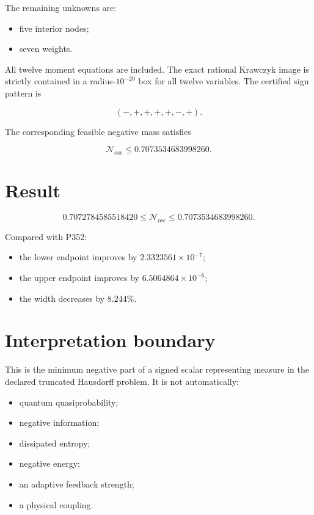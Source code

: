 \documentclass[11pt,a4paper,openany]{report}
\begin{document}
The remaining unknowns are:

\begin{itemize}
\item 
five interior nodes;

\item 
seven weights.

\end{itemize}

All twelve moment equations are included. The exact rational Krawczyk image is strictly contained in a radius-\(10^{-20}\) box for all twelve variables. The certified sign pattern is

\[
(-,+,+,+,+,-,+).
\]

The corresponding feasible negative mass satisfies

\[
\mathcal N_{\mathrm{osc}}
\leq0.7073534683998260.
\]

\section{Result}

\[
\boxed{
0.7072784585518420
\leq
\mathcal N_{\mathrm{osc}}
\leq
0.7073534683998260
}.
\]

Compared with P352:

\begin{itemize}
\item 
the lower endpoint improves by \(2.3323561\times10^{-7}\);

\item 
the upper endpoint improves by \(6.5064864\times10^{-6}\);

\item 
the width decreases by \(8.244\%\).

\end{itemize}

\section{Interpretation boundary}

This is the minimum negative part of a signed scalar representing measure in the declared truncated Hausdorff problem. It is not automatically:

\begin{itemize}
\item 
quantum quasiprobability;

\item 
negative information;

\item 
dissipated entropy;

\item 
negative energy;

\item 
an adaptive feedback strength;

\item 
a physical coupling.

\end{itemize}
\end{document}
